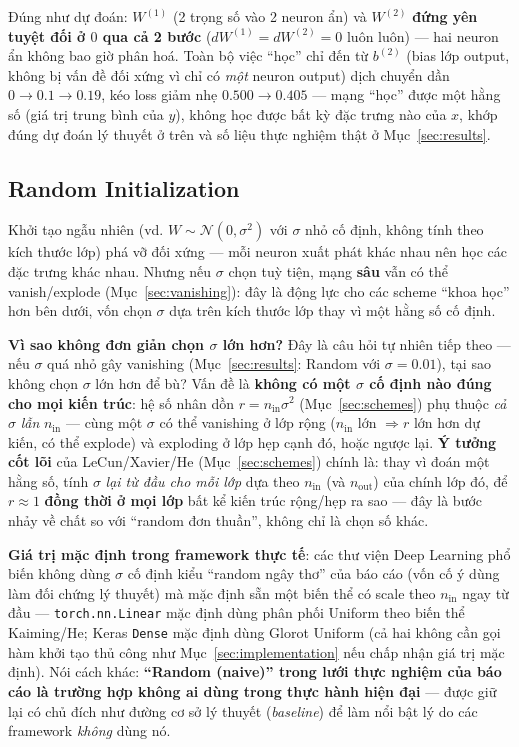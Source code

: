 \documentclass[12pt,a4paper]{report}
\newcommand{\en}[1]{\textit{#1}}
\begin{document}
Đúng như dự đoán: $W^{(1)}$ (2 trọng số vào 2 neuron ẩn) và $W^{(2)}$
\textbf{đứng yên tuyệt đối ở $0$ qua cả 2 bước} ($dW^{(1)}=dW^{(2)}=0$
luôn luôn) --- hai neuron ẩn không bao giờ phân hoá. Toàn bộ việc ``học''
chỉ đến từ $b^{(2)}$ (bias lớp output, không bị vấn đề đối xứng vì chỉ có
\emph{một} neuron output) dịch chuyển dần $0\to0.1\to0.19$, kéo loss
giảm nhẹ $0.500\to0.405$ --- mạng ``học'' được một hằng số (giá trị
trung bình của $y$), không học được bất kỳ đặc trưng nào của $x$, khớp
đúng dự đoán lý thuyết ở trên và số liệu thực nghiệm thật ở
Mục~\ref{sec:results}.

\subsection{Random Initialization}
\label{sec:random}

Khởi tạo ngẫu nhiên (vd. $W\sim\mathcal N(0,\sigma^2)$ với $\sigma$ nhỏ cố
định, không tính theo kích thước lớp) phá vỡ đối xứng --- mỗi neuron xuất
phát khác nhau nên học các đặc trưng khác nhau. Nhưng nếu $\sigma$ chọn
tuỳ tiện, mạng \textbf{sâu} vẫn có thể vanish/explode
(Mục~\ref{sec:vanishing}): đây là động lực cho các scheme ``khoa học'' hơn
bên dưới, vốn chọn $\sigma$ dựa trên kích thước lớp thay vì một hằng số cố
định.

\textbf{Vì sao không đơn giản chọn $\sigma$ lớn hơn?} Đây là câu hỏi tự
nhiên tiếp theo --- nếu $\sigma$ quá nhỏ gây vanishing (Mục~\ref{sec:results}:
Random với $\sigma=0.01$), tại sao không chọn $\sigma$ lớn hơn để bù?
Vấn đề là \textbf{không có một $\sigma$ cố định nào đúng cho mọi kiến
trúc}: hệ số nhân dồn $r=n_{\text{in}}\sigma^2$ (Mục~\ref{sec:schemes})
phụ thuộc \emph{cả} $\sigma$ \emph{lẫn} $n_{\text{in}}$ --- cùng một
$\sigma$ có thể vanishing ở lớp rộng ($n_{\text{in}}$ lớn $\Rightarrow r$
lớn hơn dự kiến, có thể explode) và exploding ở lớp hẹp cạnh đó, hoặc
ngược lại. \textbf{Ý tưởng cốt lõi} của LeCun/Xavier/He (Mục~\ref{sec:schemes})
chính là: thay vì đoán một hằng số, tính $\sigma$ \emph{lại từ đầu cho mỗi
lớp} dựa theo $n_{\text{in}}$ (và $n_{\text{out}}$) của chính lớp đó, để
$r\approx1$ \textbf{đồng thời ở mọi lớp} bất kể kiến trúc rộng/hẹp ra
sao --- đây là bước nhảy về chất so với ``random đơn thuần'', không chỉ là
chọn số khác.

\textbf{Giá trị mặc định trong framework thực tế}: các thư viện Deep
Learning phổ biến không dùng $\sigma$ cố định kiểu ``random ngây thơ'' của
báo cáo (vốn cố ý dùng làm đối chứng lý thuyết) mà mặc định sẵn một biến
thể có scale theo $n_{\text{in}}$ ngay từ đầu --- \texttt{torch.nn.Linear}
mặc định dùng phân phối Uniform theo biến thể Kaiming/He; Keras
\texttt{Dense} mặc định dùng Glorot Uniform (cả hai không cần gọi hàm
khởi tạo thủ công như Mục~\ref{sec:implementation} nếu chấp nhận giá trị
mặc định). Nói cách khác: \textbf{``Random (naive)'' trong lưới thực
nghiệm của báo cáo là trường hợp không ai dùng trong thực hành hiện đại}
--- được giữ lại có chủ đích như đường cơ sở lý thuyết (\en{baseline}) để
làm nổi bật lý do các framework \emph{không} dùng nó.
\end{document}
